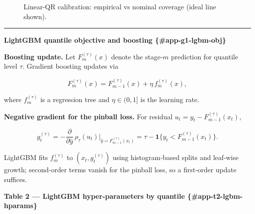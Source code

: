 \documentclass[
  a4paper,
  DIV=11,
  numbers=noendperiod]{scrreprt}
\begin{document}
\begin{figure}


\caption{\label{fig-lqr-calibration}Linear-QR calibration: empirical vs
nominal coverage (ideal line shown).}

\end{figure}%

\begin{center}\rule{0.5\linewidth}{0.5pt}\end{center}

\textbf{LightGBM quantile objective and boosting \{\#app-g1-lgbm-obj\}}

\textbf{Boosting update.} Let \(F_m^{(\tau)}(x)\) denote the stage‑\(m\)
prediction for quantile level \(\tau\). Gradient boosting updates via

\[
F_{m}^{(\tau)}(x) = F_{m-1}^{(\tau)}(x) + \eta\, f_{m}^{(\tau)}(x),
\]

where \(f_{m}^{(\tau)}\) is a regression tree and \(\eta\in(0,1]\) is
the learning rate.

\textbf{Negative gradient for the pinball loss.} For residual
\(u_t = y_t - F_{m-1}^{(\tau)}(x_t)\),

\[
 g_{t}^{(\tau)} = -\frac{\partial}{\partial \hat y}\,\rho_{\tau}(u_t)\Big|_{\hat y = F_{m-1}^{(\tau)}(x_t)} = \tau - \mathbf{1}\{ y_t < F_{m-1}^{(\tau)}(x_t) \}.
\]

LightGBM fits \(f_{m}^{(\tau)}\) to \((x_t,g_t^{(\tau)})\) using
histogram‑based splits and leaf‑wise growth; second‑order terms vanish
for the pinball loss, so a first‑order update suffices.

\textbf{Table 2 --- LightGBM hyper‑parameters by quantile
\{\#app-t2-lgbm-hparams\}}
\end{document}
